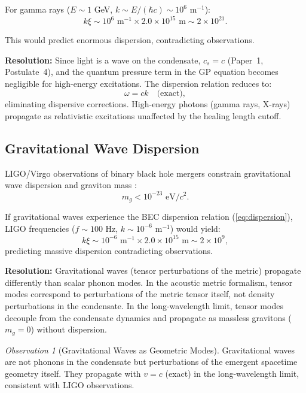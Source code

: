 \documentclass[11pt,a4paper]{article}
\newcommand{\cs}{\ensuremath{c_s}}
\theoremstyle{definition}
\theoremstyle{remark}
\newtheorem{observation}[theorem]{Observation}
\begin{document}
For gamma rays ($E \sim 1$ GeV, $k \sim E/(\hbar c) \sim 10^6$ m$^{-1}$):
\begin{equation}
k\xi \sim 10^6 \text{ m}^{-1} \times 2.0 \times 10^{15} \text{ m} \sim 2 \times 10^{21}.
\end{equation}

This would predict enormous dispersion, contradicting observations.

\textbf{Resolution:} Since light is a wave on the condensate, $\cs = c$ (Paper~1, Postulate~4), and the quantum pressure term in the GP equation becomes negligible for high-energy excitations. The dispersion relation reduces to:
\begin{equation}
\omega = c k \quad \text{(exact)},
\end{equation}
eliminating dispersive corrections. High-energy photons (gamma rays, X-rays) propagate as relativistic excitations unaffected by the healing length cutoff.

\subsection{Gravitational Wave Dispersion}
\label{sec:gw_dispersion}

LIGO/Virgo observations of binary black hole mergers constrain gravitational wave dispersion and graviton mass \cite{LIGO2021}:
\begin{equation}
m_g < 10^{-23} \text{ eV}/c^2.
\end{equation}

If gravitational waves experience the BEC dispersion relation (\ref{eq:dispersion}), LIGO frequencies ($f \sim 100$ Hz, $k \sim 10^{-6}$ m$^{-1}$) would yield:
\begin{equation}
k\xi \sim 10^{-6} \text{ m}^{-1} \times 2.0 \times 10^{15} \text{ m} \sim 2 \times 10^{9},
\end{equation}
predicting massive dispersion contradicting observations.

\textbf{Resolution:} Gravitational waves (tensor perturbations of the metric) propagate differently than scalar phonon modes. In the acoustic metric formalism, tensor modes correspond to perturbations of the metric tensor itself, not density perturbations in the condensate. In the long-wavelength limit, tensor modes decouple from the condensate dynamics and propagate as massless gravitons ($m_g = 0$) without dispersion.

\begin{observation}[Gravitational Waves as Geometric Modes]
Gravitational waves are not phonons in the condensate but perturbations of the emergent spacetime geometry itself. They propagate with $v = c$ (exact) in the long-wavelength limit, consistent with LIGO observations.
\end{observation}
\end{document}
